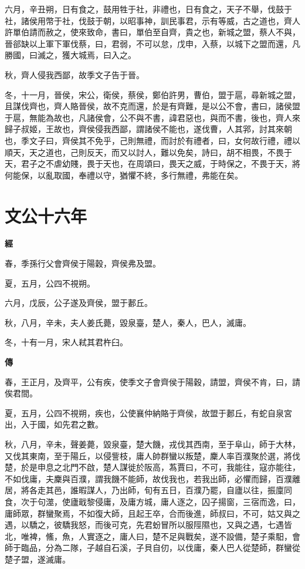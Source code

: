 \documentclass{ctexart}
\begin{document}
六月，辛丑朔，日有食之，鼓用牲于社，非禮也，日有食之，天子不舉，伐鼓于社，諸侯用幣于社，伐鼓于朝，以昭事神，訓民事君，示有等威，古之道也，齊人許單伯請而赦之，使來致命，書曰，單伯至自齊，貴之也，新城之盟，蔡人不與，晉郤缺以上軍下軍伐蔡，曰，君弱，不可以怠，戊申，入蔡，以城下之盟而還，凡勝國，曰滅之，獲大城焉，曰入之。

秋，齊人侵我西鄙，故季文子告于晉。

冬，十一月，晉侯，宋公，衛侯，蔡侯，鄭伯許男，曹伯，盟于扈，尋新城之盟，且謀伐齊也，齊人賂晉侯，故不克而還，於是有齊難，是以公不會，書曰，諸侯盟于扈，無能為故也，凡諸侯會，公不與不書，諱君惡也，與而不書，後也，齊人來歸子叔姬，王故也，齊侯侵我西鄙，謂諸侯不能也，遂伐曹，人其郛，討其來朝也，季文子曰，齊侯其不免乎，己則無禮，而討於有禮者，曰，女何故行禮，禮以順天，天之道也，己則反天，而又以討人，難以免矣，詩曰，胡不相畏，不畏于天，君子之不虐幼賤，畏于天也，在周頌曰，畏天之威，于時保之，不畏于天，將何能保，以亂取國，奉禮以守，猶懼不終，多行無禮，弗能在矣。





\section{文公十六年}


\textbf{經}



春，季孫行父會齊侯于陽穀，齊侯弗及盟。

夏，五月，公四不視朔。

六月，戊辰，公子遂及齊侯，盟于郪丘。

秋，八月，辛未，夫人姜氏薨，毀泉臺，楚人，秦人，巴人，滅庸。

冬，十有一月，宋人弒其君杵臼。

\textbf{傳}



春，王正月，及齊平，公有疾，使季文子會齊侯于陽穀，請盟，齊侯不肯，曰，請俟君間。

夏，五月，公四不視朔，疾也，公使襄仲納賂于齊侯，故盟于郪丘，有蛇自泉宮出，入于國，如先君之數。

秋，八月，辛未，聲姜薨，毀泉臺，楚大饑，戎伐其西南，至于阜山，師于大林，又伐其東南，至于陽丘，以侵訾枝，庸人帥群蠻以叛楚，麇人率百濮聚於選，將伐楚，於是申息之北門不啟，楚人謀徙於阪高，蒍賈曰，不可，我能往，寇亦能往，不如伐庸，夫麇與百濮，謂我饑不能師，故伐我也，若我出師，必懼而歸，百濮離居，將各走其邑，誰暇謀人，乃出師，旬有五日，百濮乃罷，自廬以往，振廩同食，次于句澨，使廬戢黎侵庸，及庸方城，庸人逐之，囚子揚窗，三宿而逸，曰，庸師眾，群蠻聚焉，不如復大師，且起王卒，合而後進，師叔曰，不可，姑又與之遇，以驕之，彼驕我怒，而後可克，先君蚡冒所以服陘隰也，又與之遇，七遇皆北，唯裨，鯈，魚，人實逐之，庸人曰，楚不足與戰矣，遂不設備，楚子乘馹，會師于臨品，分為二隊，子越自石溪，子貝自仞，以伐庸，秦人巴人從楚師，群蠻從楚子盟，遂滅庸。
\end{document}
